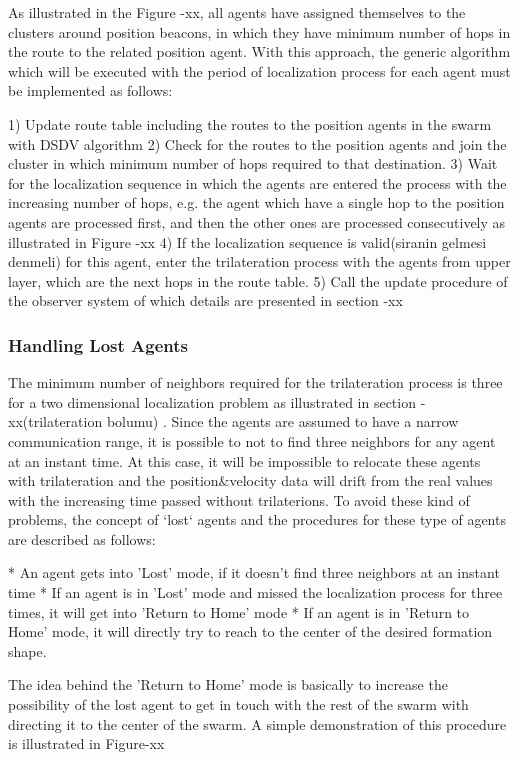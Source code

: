 \documentclass[twoside]{article}
\begin{document}
	
	As illustrated in the Figure -xx, all agents have assigned themselves to the clusters around position beacons, in which they have minimum number of hops in the route to the related position agent.  With this approach, the generic algorithm which will be executed with the period of localization process for each agent must be implemented as follows:
	
	1) Update route table including the routes to the position agents in the swarm with DSDV algorithm 
	2) Check for the routes to the position agents and join the cluster in which minimum number of hops required to that destination.
	3) Wait for the localization sequence in which the agents are entered the process with the increasing number of hops, e.g. the agent which have a single hop to the position agents are processed first, and then the other ones are processed consecutively as illustrated in Figure -xx
	4) If the localization sequence is valid(siranin gelmesi denmeli) for this agent, enter the trilateration process with the agents from upper layer,  which are the next hops in the route table.
	5) Call the update procedure of the observer system of which details are presented in section -xx
	
	\subsubsection{Handling Lost Agents}
	
	The minimum number of neighbors required for the trilateration process is three for a two dimensional localization problem as illustrated in section -xx(trilateration bolumu) . Since the agents are assumed to have a narrow communication range, it is possible to not to find three neighbors for any agent at an instant time. At this case, it will be impossible to relocate these agents with trilateration and the position$\&$velocity data will drift from the real values with the increasing time passed without trilaterions. To avoid these kind of problems, the concept of `lost` agents and the procedures for these type of agents are described as follows:
	
	* An agent gets into 'Lost' mode, if it doesn't find three neighbors at an instant time
	* If an agent is in 'Lost' mode and missed the localization process for three times, it will get into 'Return to Home' mode
	* If an agent is in 'Return to Home' mode, it will directly try to reach to the center of the desired formation shape.
	
	The idea behind the 'Return to Home' mode is basically to increase the possibility of the lost agent to get in touch with the rest of the swarm with directing it to the center of the swarm. A simple demonstration of this procedure is illustrated in Figure-xx
	
\end{document}
